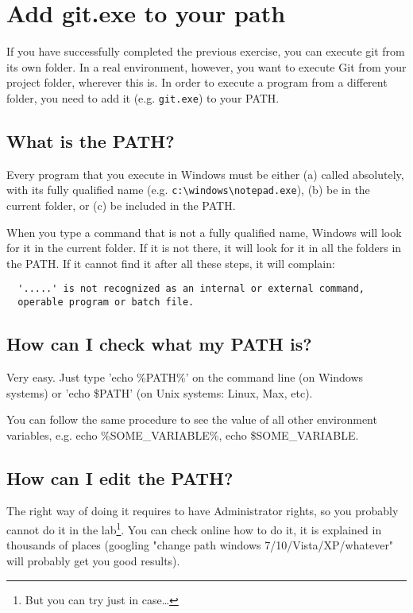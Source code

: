 \documentclass{article}
\begin{document}
\vspace{1cm}

\section{Add git.exe to your path}
\label{sec:add-git.exe-your}

If you have successfully completed the previous exercise, you can
execute git from its own folder. In a real environment, however, you
want to execute Git from your project folder, wherever this is. In
order to execute a program from a different folder, you need to add it
(e.g. \verb+git.exe+) to your PATH. 

\subsection{What is the PATH?}
\label{sec:what-path}

Every program that you execute in Windows must be either (a) called
absolutely, with its fully qualified name
(e.g. \verb+c:\windows\notepad.exe+), (b) be in the current folder, 
or (c) be included in the PATH.

When you type a command that is not a fully qualified name, Windows
will look for it in the current folder. If it is not there, it will
look for it in all the folders in the PATH. If it cannot find it after
all these steps, it will complain:

\begin{verbatim}
  '.....' is not recognized as an internal or external command,
  operable program or batch file.
\end{verbatim}

\subsection{How can I check what my PATH is?}

Very easy. Just type 'echo \%PATH\%' on the command line (on Windows
systems) or 'echo \$PATH' (on Unix systems: Linux, Max, etc).

You can follow the same procedure to see the value of all other
environment variables, e.g. echo \%SOME\_VARIABLE\%, echo
\$SOME\_VARIABLE. 

\subsection{How can I edit the PATH?}

The right way of doing it requires to have Administrator rights, so
you probably cannot do it in the lab\footnote{But you can try just in
  case\ldots}.  
You can check online how to do it, it is
explained in thousands of places (googling "change path windows
7/10/Vista/XP/whatever" will probably get you good results).
\end{document}
